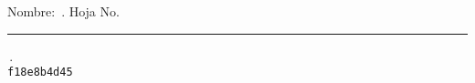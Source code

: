 \documentclass{article}
\author{M. en C. Reinaldo Arturo Zapata Pe\~na}
\date{}
\title{}
\begin{document}
\small{Nombre: \hrulefill \,. Hoja No. \rule{2cm}{0.5pt}\,.  \\

\vfill
\hfill \tt{f18e8b4d45}
}
\end{document}
